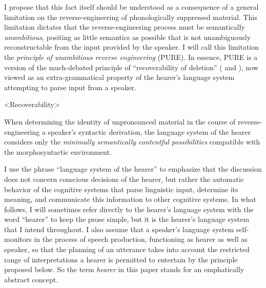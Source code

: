 \documentclass[output=paper]{langscibook}
\begin{document}
\begin{sloppypar}
\noindent I propose that this fact itself should be understood as a consequence of a general limitation on the reverse-engineering of phonologically suppressed material. This limitation dictates that the reverse-engineering process must be semantically \textit{unambitious}, positing as little semantics as possible that is not unambiguously reconstructable from the input provided by the speaker. I will call this limitation the \textit{principle of unambitious reverse engineering} (PURE). In essence, PURE is a version of the much-debated principle of “recoverability of deletion” (\citealt[41]{Chomsky1964c} and \citealt[79ff]{Katz:1964}), now viewed as an extra-grammatical property of the hearer's language system attempting to parse input from a speaker. 
\end{sloppypar}

\pex<Recoverability>

When determining the identity of unpronounced material in the course of reverse-engineering a speaker's syntactic derivation, the language system of the hearer considers only the \textit{minimally semantically contentful possibilities} compatible with the morphosyntactic environment. 
\xe

I use the phrase “language system of the hearer” to emphasize that the discussion does not concern conscious decisions of the hearer, but rather the automatic behavior of the cognitive systems that parse linguistic input, determine its meaning, and communicate this information to other cognitive systems. In what follows, I will sometimes refer directly to the hearer's language system with the word “hearer” to keep the prose simple, but it is the hearer's language system that I intend throughout. I also assume that a speaker's language system self-monitors in the process of speech production, functioning as hearer as well as speaker, so that the planning of an utterance takes into account the restricted range of interpretations a hearer is permitted to entertain by the principle proposed below. So the term \textit{hearer} in this paper stands for an emphatically abstract concept. 
\end{document}
